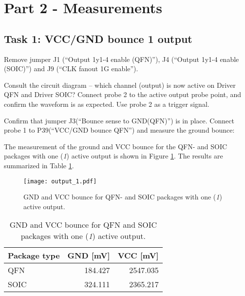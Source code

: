 \documentclass[../main.tex]{subfiles}
\begin{document}
\section{Part 2 - Measurements}

\subsection{Task 1: VCC/GND bounce 1 output}

Remove jumper J1 (“Output 1y1-4 enable (QFN)”), J4 (“Output 1y1-4 enable (SOIC)”) and J9 (“CLK fanout 1G enable”).

\vspace{10pt}

Consult the circuit diagram – which channel (output) is now active on Driver QFN and Driver SOIC? Connect probe 2 to the active output probe point, and confirm the waveform is as expected. Use probe 2 as a trigger signal.

\vspace{10pt}

Confirm that jumper J3(“Bounce sense to GND(QFN)”) is in place. Connect probe 1 to P39(“VCC/GND bounce QFN”) and measure the ground bounce:

\solution

The measurement of the ground and VCC bounce for the QFN- and SOIC packages with one (\textit{1}) active output is shown in Figure \ref{fig:gnd_vcc_output_1}. The results are summarized in Table \ref{tab:output_1}.

\begin{figure}[H]
    \centering
    \texttt{[image: output\_1.pdf]}
    \caption{GND and VCC bounce for QFN- and SOIC packages with one (\textit{1}) active output.}
    \label{fig:gnd_vcc_output_1}
\end{figure}

\begin{table}[H]
    \centering
    \begin{tabular}{l | r r}
        \toprule[1pt]
        Package type    & GND [mV]  & VCC [mV]\\
        \midrule
        QFN             & 184.427   & 2547.035  \\
        SOIC            & 324.111   & 2365.217  \\
        \bottomrule[1pt]
    \end{tabular}
    \caption{GND and VCC bounce for QFN and SOIC packages with one (\textit{1}) active output.}
    \label{tab:output_1}
\end{table}
\end{document}

